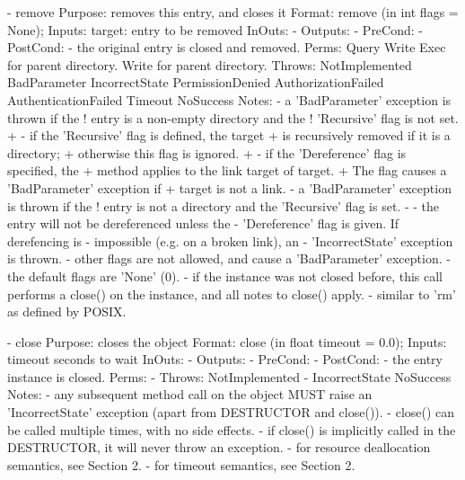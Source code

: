 \begin{myspec}
 
    - remove
      Purpose:  removes this entry, and closes it
      Format:   remove             (in  int  flags = None);
      Inputs:   target:             entry to be removed
      InOuts:   -
      Outputs:  -
      PreCond:  -
      PostCond: - the original entry is closed and removed.
      Perms:    Query 
                Write 
                Exec  for parent directory.
                Write for parent directory.
      Throws:   NotImplemented
                BadParameter
                IncorrectState
                PermissionDenied
                AuthorizationFailed
                AuthenticationFailed
                Timeout
                NoSuccess
      Notes:    - a 'BadParameter' exception is thrown if the 
!                 entry is a non-empty directory and the 
!                 'Recursive' flag is not set.
+               - if the 'Recursive' flag is defined, the target
+                 is recursively removed if it is a directory;
+                 otherwise this flag is ignored.
+               - if the 'Dereference' flag is specified, the
+                 method applies to the link target of target.
+                 The flag causes a 'BadParameter' exception if
+                 target is not a link.
                - a 'BadParameter' exception is thrown if the 
!                 entry is not a directory and the 'Recursive' 
                  flag is set.
-               - the entry will not be dereferenced unless the
-                 'Dereference' flag is given.  If derefencing is
-                 impossible (e.g. on a broken link), an
-                 'IncorrectState' exception is thrown.
                - other flags are not allowed, and cause a
                  'BadParameter' exception.
                - the default flags are 'None' (0).
                - if the instance was not closed before, this
                  call performs a close() on the instance, and 
                  all notes to close() apply.
                - similar to 'rm' as defined by POSIX.
 
 
    - close
      Purpose:  closes the object
      Format:   close              (in  float timeout = 0.0);
      Inputs:   timeout             seconds to wait
      InOuts:   -
      Outputs:  -
      PreCond:  -
      PostCond: - the entry instance is closed.
      Perms:    -
      Throws:   NotImplemented
-               IncorrectState
                NoSuccess
      Notes:    - any subsequent method call on the object
                  MUST raise an 'IncorrectState' exception
                  (apart from DESTRUCTOR and close()).
                - close() can be called multiple times, with no
                  side effects.
                - if close() is implicitly called in the
                  DESTRUCTOR, it will never throw an exception.
                - for resource deallocation semantics, see 
                  Section 2.
                - for timeout semantics, see Section 2.
 

\end{myspec}
